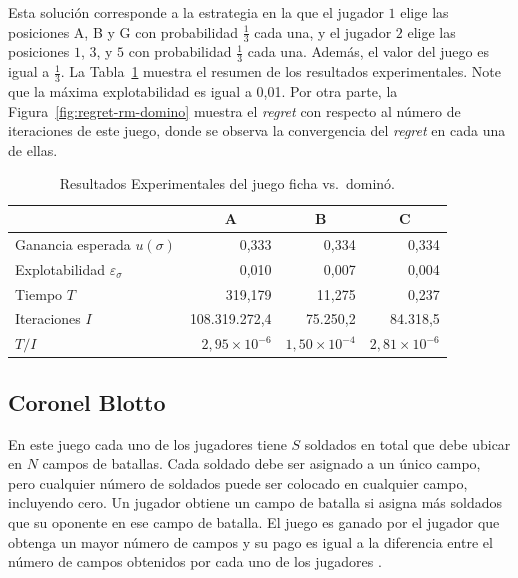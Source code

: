 Esta solución corresponde a la estrategia en la que el jugador $1$ elige las posiciones A, B y G con probabilidad $\frac{1}{3}$ cada una, y el jugador $2$ elige las posiciones $1$, $3$, y $5$ con probabilidad $\frac{1}{3}$ cada una. Además, el valor del juego es igual a $\frac{1}{3}$. La Tabla~\ref{table:resultados-rm-domino} muestra el resumen de los resultados experimentales. Note que la máxima explotabilidad es igual a 0,01. Por otra parte, la Figura~\ref{fig:regret-rm-domino} muestra el \textit{regret} con respecto al número de iteraciones de este juego, donde se observa la convergencia del \textit{regret} en cada una de ellas.

\begin{table}[h]
\caption{Resultados Experimentales del juego ficha vs.\ dominó.}
\label{table:resultados-rm-domino}
\centering
\begin{tabular}{l r r r}
    \toprule
    & \multicolumn{1}{c}{A} & \multicolumn{1}{c}{B} & \multicolumn{1}{c}{C} \\ \midrule
    Ganancia esperada $u(\sigma)$ & 0,333 & 0,334 & 0,334  \\
    Explotabilidad $\varepsilon_{\sigma}$ & 0,010 & 0,007 & 0,004 \\
    Tiempo $T$ & 319,179 & 11,275 & 0,237  \\
    Iteraciones $I$ & 108.319.272,4 & 75.250,2 & 84.318,5 \\
    $T/I$ & $2,95 {\times} 10^{-6}$ & $1,50 {\times} 10^{-4}$ & $2,81 {\times} 10^{-6}$ \\
    \bottomrule
\end{tabular}
\end{table}
 
\subsection*{Coronel Blotto}

En este juego cada uno de los jugadores tiene $S$ soldados en total que debe ubicar en $N$ campos de batallas. Cada soldado debe ser asignado a un único campo, pero cualquier número de soldados puede ser colocado en cualquier campo, incluyendo cero. Un jugador obtiene un campo de batalla si asigna más soldados que su oponente en ese campo de batalla. El juego es ganado por el jugador que obtenga un mayor número de campos y su pago es igual a la diferencia entre el número de campos obtenidos por cada uno de los jugadores \cite{bib:blotto-game}.

